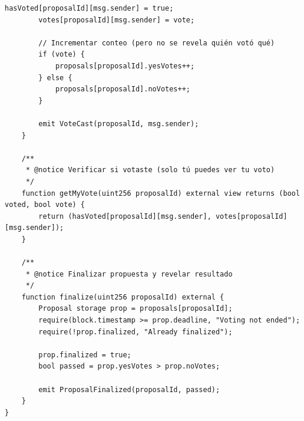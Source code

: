 \documentclass[11pt,a4paper,twoside]{book}
\theoremstyle{definition}
\theoremstyle{remark}
\begin{document}
\begin{lstlisting}[language=Solidity, caption={Contrato confidencial en Oasis Sapphire}]
        hasVoted[proposalId][msg.sender] = true;
        votes[proposalId][msg.sender] = vote;
        
        // Incrementar conteo (pero no se revela quién votó qué)
        if (vote) {
            proposals[proposalId].yesVotes++;
        } else {
            proposals[proposalId].noVotes++;
        }
        
        emit VoteCast(proposalId, msg.sender);
    }
    
    /**
     * @notice Verificar si votaste (solo tú puedes ver tu voto)
     */
    function getMyVote(uint256 proposalId) external view returns (bool voted, bool vote) {
        return (hasVoted[proposalId][msg.sender], votes[proposalId][msg.sender]);
    }
    
    /**
     * @notice Finalizar propuesta y revelar resultado
     */
    function finalize(uint256 proposalId) external {
        Proposal storage prop = proposals[proposalId];
        require(block.timestamp >= prop.deadline, "Voting not ended");
        require(!prop.finalized, "Already finalized");
        
        prop.finalized = true;
        bool passed = prop.yesVotes > prop.noVotes;
        
        emit ProposalFinalized(proposalId, passed);
    }
}
\end{lstlisting}
\end{document}
